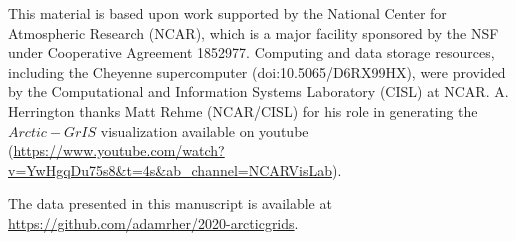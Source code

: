 \documentclass[draft]{agujournal2019}
\begin{document}
%

%




%
%
%
%
%
%
%
%


\acknowledgments
This material is based upon work supported by the National Center for Atmospheric Research (NCAR), which is a major facility sponsored by the NSF under Cooperative Agreement 1852977. Computing and data storage resources, including the Cheyenne supercomputer (doi:10.5065/D6RX99HX), were provided by the Computational and Information Systems Laboratory (CISL) at NCAR. A. Herrington thanks Matt Rehme (NCAR/CISL) for his role in generating the $Arctic-GrIS$ visualization available on youtube ({\url{https://www.youtube.com/watch?v=YwHgqDu75s8&t=4s&ab_channel=NCARVisLab}}).

The data presented in this manuscript is available at {\url{https://github.com/adamrher/2020-arcticgrids}}.



\end{document}
